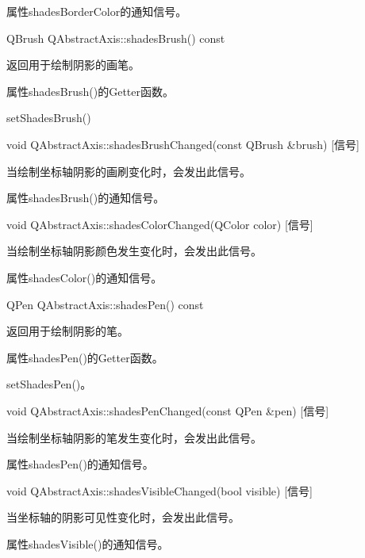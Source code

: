 \begin{notice}
属性shadesBorderColor的通知信号。
\end{notice}

QBrush QAbstractAxis::shadesBrush() const 

返回用于绘制阴影的画笔。

\begin{notice}
属性shadesBrush()的Getter函数。
\end{notice}
        
\begin{notice}[另请参阅]
setShadesBrush()
\end{notice}

void QAbstractAxis::shadesBrushChanged(const QBrush \&brush) [信号] 

当绘制坐标轴阴影的画刷变化时，会发出此信号。 

\begin{notice}
属性shadesBrush()的通知信号。
\end{notice}

void QAbstractAxis::shadesColorChanged(QColor color) [信号] 

当绘制坐标轴阴影颜色发生变化时，会发出此信号。 

\begin{notice}
属性shadesColor()的通知信号。
\end{notice}

QPen QAbstractAxis::shadesPen() const 

返回用于绘制阴影的笔。

\begin{notice}
属性shadesPen()的Getter函数。
\end{notice}
    
\begin{notice}[另请参阅]
setShadesPen()。
\end{notice}

void QAbstractAxis::shadesPenChanged(const QPen \&pen) [信号] 

当绘制坐标轴阴影的笔发生变化时，会发出此信号。

\begin{notice}
属性shadesPen()的通知信号。
\end{notice}

void QAbstractAxis::shadesVisibleChanged(bool visible) [信号] 

当坐标轴的阴影可见性变化时，会发出此信号。

\begin{notice}
属性shadesVisible()的通知信号。
\end{notice}


